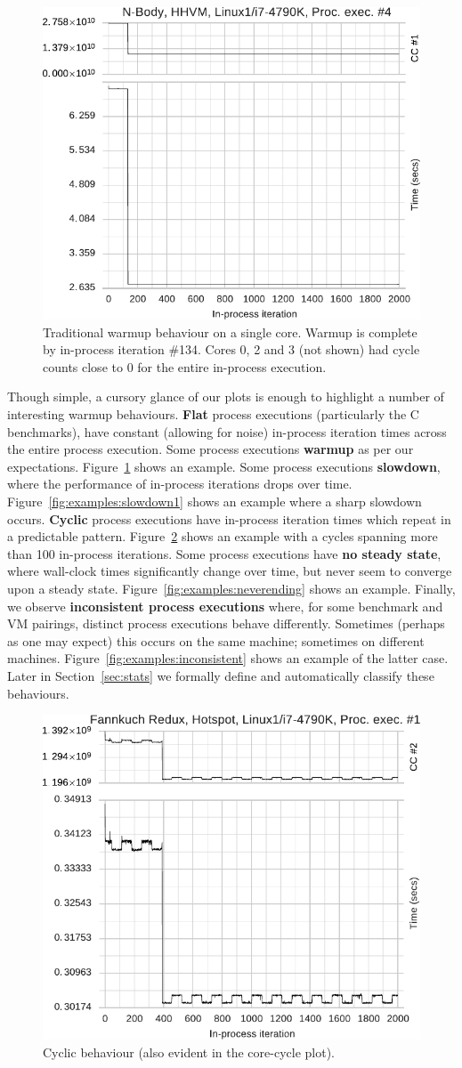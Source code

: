 \documentclass[preprint,numbers,10pt]{sigplanconf}
\begin{document}
\begin{figure}[tbp]
\centering
\includegraphics[width=.45\textwidth]{examples/new_warmup_no_migrate.pdf}
\caption{Traditional warmup behaviour on a single core. Warmup is complete by
in-process iteration \#134. Cores 0, 2 and 3 (not shown) had cycle counts close
to 0 for the entire in-process execution.}
\label{fig:examples:trad}
\end{figure}

Though simple, a cursory glance of our plots is enough to highlight a number of
interesting warmup behaviours. \textbf{Flat} process executions (particularly
the C benchmarks), have constant (allowing for noise) in-process iteration
times across the entire process execution. Some process executions
\textbf{warmup} as per our expectations. Figure~\ref{fig:examples:trad} shows
an example. Some process executions \textbf{slowdown}, \label{sub:slowdowns}
where the performance of
in-process iterations drops over time. Figure~\ref{fig:examples:slowdown1} shows
an example where a sharp slowdown occurs.
\textbf{Cyclic} \label{sub:cyclic} process executions have in-process iteration
times which repeat in a predictable pattern. Figure~\ref{fig:examples:cycles}
shows an example with a cycles spanning more than 100 in-process iterations.
Some process executions have \textbf{no steady state}, \label{sub:long} where
wall-clock times significantly change over time, but never seem to converge
upon a steady state. Figure~\ref{fig:examples:neverending} shows an example.
Finally, we observe \textbf{inconsistent process executions}
\label{sub:inconsistent} where, for some benchmark and VM pairings, distinct
process executions behave differently. Sometimes (perhaps as one may expect)
this occurs on the same machine; sometimes on different machines.
Figure~\ref{fig:examples:inconsistent} shows an example of the latter case.
Later in Section~\ref{sec:stats} we formally define and automatically classify
these behaviours.


\begin{figure}[tbp]
\centering
\includegraphics[width=.45\textwidth]{examples/new_cyclic.pdf}
\caption{Cyclic behaviour (also evident in the core-cycle plot).}
\label{fig:examples:cycles}
\end{figure}
\end{document}
